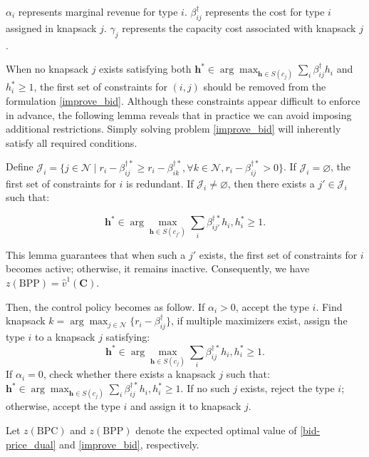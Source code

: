$\alpha_{i}$ represents marginal revenue for type $i$. $\beta_{ij}^{\dag}$ represents the cost for type $i$ assigned in knapsack $j$. $\gamma_{j}$ represents the capacity cost associated with knapsack $j$.

When no knapsack $j$ exists satisfying both $\bm{h}^{*} \in \arg\max_{\bm{h} \in S(c_j)} \sum_{i} \beta_{ij}^{\dag} h_{i}$ and $h_{i}^{*} \geq 1$, the first set of constraints for $(i,j)$ should be removed from the formulation \eqref{improve_bid}. Although these constraints appear difficult to enforce in advance, the following lemma reveals that in practice we can avoid imposing additional restrictions. Simply solving problem \eqref{improve_bid} will inherently satisfy all required conditions.


\begin{lem}\label{BPP}
Define $\mathcal{J}_{i} = \{j \in \mathcal{N} \mid r_i - \beta_{ij}^{\dag *} \geq r_i - \beta_{ik}^{\dag *},\forall k \in \mathcal{N}, r_i - \beta_{ij}^{\dag *} >0 \}$.
If $\mathcal{J}_{i} = \varnothing$, the first set of constraints for $i$ is redundant.
If $\mathcal{J}_{i} \neq \varnothing$, then there exists a $j{'} \in \mathcal{J}_{i}$ such that:

$$\bm{h}^{*} \in \arg\max_{\bm{h} \in S(c_{j{'}})} \sum_{i} \beta_{ij{'}}^{\dag *} h_{i}, h_{i}^{*} \geq 1.$$
\end{lem}

This lemma guarantees that when such a $j{'}$ exists, the first set of constraints for $i$ becomes active; otherwise, it remains inactive. Consequently, we have $z(\text{BPP}) = \hat{v}^{1}(\bm{C})$.

Then, the control policy becomes as follow. If $\alpha_{i} > 0$, accept the type $i$. Find knapsack $k = \arg \max_{j \in \mathcal{N}}\{r_i - \beta_{ij}^{\dag}\}$, if multiple maximizers exist, assign the type $i$ to a knapsack $j$ satisfying: $$\bm{h}^{*} \in \arg\max_{\bm{h} \in S(c_j)} \sum_{i} \beta_{ij}^{\dag *} h_{i}, h_{i}^{*} \geq 1.$$ If $\alpha_{i} = 0$, check whether there exists a knapsack $j$ such that: $\bm{h}^{*} \in \arg\max_{\bm{h} \in S(c_j)} \sum_{i} \beta_{ij}^{\dag *} h_{i}, h_{i}^{*} \geq 1$. If no such $j$ exists, reject the type $i$; otherwise, accept the type $i$ and assign it to knapsack $j$.

Let $z(\text{BPC})$ and $z(\text{BPP})$ denote the expected optimal value of \eqref{bid-price_dual} and \eqref{improve_bid}, respectively.

